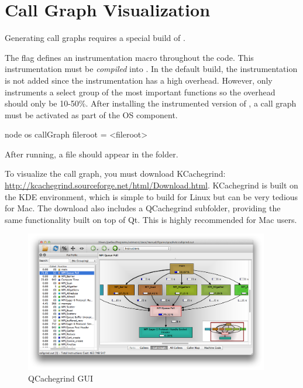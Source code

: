 

\section{Call Graph Visualization}
\label{sec:tutorials:callgraph}
Generating call graphs requires a special build of \sstmacro.

The  flag defines an instrumentation macro throughout the \sstmacro code.
This instrumentation must be \emph{compiled} into \sstmacro.
In the default build, the instrumentation is not added since the instrumentation has a high overhead.
However, \sstmacro only instruments a select group of the most important functions so the overhead should only be 10-50\%.
After installing the instrumented version of \sstmacro, a call graph must be activated as part of the OS component.

\begin{ViFile}
node {
  os {
    callGraph {
      fileroot = <fileroot>
    }
  }
}
\end{ViFile}
After running, a  file should appear in the folder.

To visualize the call graph, you must download KCachegrind: \url{http://kcachegrind.sourceforge.net/html/Download.html}.
KCachegrind is built on the KDE environment, which is simple to build for Linux but can be very tedious for Mac.
The download also includes a QCachegrind subfolder, providing the same functionality built on top of Qt.  
This is highly recommended for Mac users.

\begin{figure}[h]
\centering
\includegraphics[width=0.95\textwidth]{figures/graphviz/gui.png}
\caption{QCachegrind GUI}
\label{fig:qcgui}
\end{figure}

